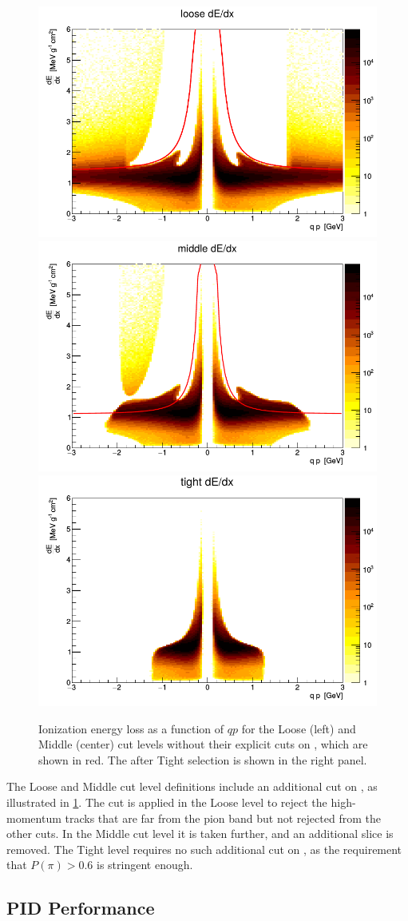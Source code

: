 \begin{figure}[t]
\includegraphics[width=.32\linewidth]{dedx_loose.png}
\includegraphics[width=.32\linewidth]{dedx_mid.png}
\includegraphics[width=.32\linewidth]{dedx_tight.png}
\caption{Ionization energy loss \dEdx as a function of $qp$ for the Loose (left) and Middle (center) cut levels without their explicit cuts on \dEdx, which are shown in red. The \dEdx after Tight selection is shown in the right panel.}
\label{fig:dedx}
\end{figure}

The Loose and Middle cut level definitions include an additional cut on \dEdx, as illustrated in \cref{fig:dedx}.
The cut is applied in the Loose level to reject the high-momentum tracks that are far from the pion band but not rejected from the other cuts.
In the Middle cut level it is taken further, and an additional slice is removed.
The Tight level requires no such additional cut on \dEdx, as the requirement that $P(\pi) > 0.6$ is stringent enough.


\subsection{PID Performance}

